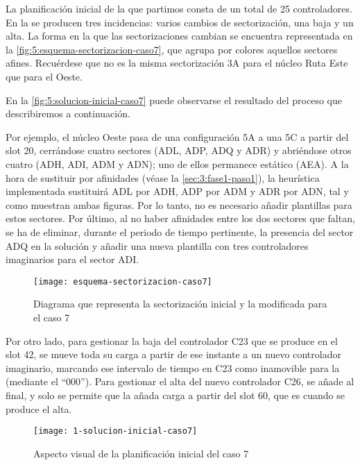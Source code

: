 La planificación inicial de la que partimos consta de un total de 25 controladores. 
En la \faseuno{} se producen tres incidencias: varios cambios de sectorización, una baja y un alta.
La forma en la que las sectorizaciones cambian se encuentra representada en la \autoref{fig:5:esquema-sectorizacion-caso7}, que agrupa por colores aquellos sectores afines. 
Recuérdese que no es la misma sectorización 3A para el núcleo Ruta Este que para el Oeste. 

En la \autoref{fig:5:solucion-inicial-caso7} puede observarse el resultado del proceso que describiremos a continuación.

Por ejemplo, el núcleo Oeste pasa de una configuración 5A a una 5C a partir del slot 20, cerrándose cuatro sectores (ADL, ADP, ADQ y ADR) y abriéndose otros cuatro (ADH, ADI, ADM y ADN); uno de ellos permanece estático (AEA). 
A la hora de sustituir por afinidades (véase la \autoref{sec:3:fase1-paso1}), la heurística implementada sustituirá ADL por ADH, ADP por ADM y ADR por ADN, tal y como muestran ambas figuras. Por lo tanto, no es necesario añadir plantillas para estos sectores. Por último, al no haber afinidades entre los dos sectores que faltan, se ha de eliminar, durante el periodo de tiempo pertinente, la presencia del sector ADQ en la solución y añadir una nueva plantilla con tres controladores imaginarios para el sector ADI.

\begin{figure}
	\centering
	\texttt{[image: esquema-sectorizacion-caso7]}
	\caption{Diagrama que representa la sectorización inicial y la modificada para el caso 7}
	\label{fig:5:esquema-sectorizacion-caso7}
\end{figure}

Por otro lado, para gestionar la baja del controlador C23 que se produce en el slot 42, se mueve toda su carga a partir de ese instante a un nuevo controlador imaginario, marcando ese intervalo de tiempo en C23 como inamovible para la \fasedos{} (mediante el ``000'').
Para gestionar el alta del nuevo controlador C26, se añade al final, y solo se permite que la \fasedos{} añada carga a partir del slot 60, que es cuando se produce el alta.

\begin{figure}
	\centering
	\texttt{[image: 1-solucion-inicial-caso7]}
	\caption{Aspecto visual de la planificación inicial del caso 7}
	\label{fig:5:solucion-inicial-caso7}
\end{figure}

